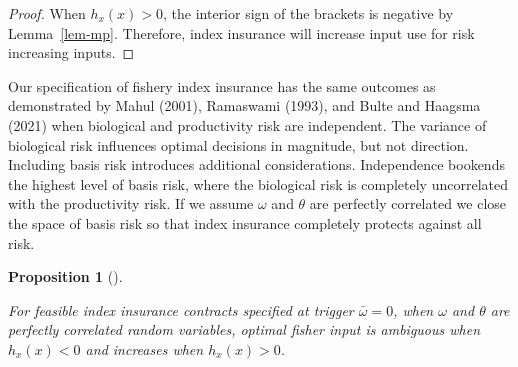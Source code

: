\documentclass[
  letterpaper,
  DIV=11,
  numbers=noendperiod]{scrartcl}
\theoremstyle{plain}
\newtheorem{proposition}{Proposition}[section]
\theoremstyle{plain}
\theoremstyle{remark}
\begin{document}
\begin{proof}
When \(h_x(x)>0\), the interior sign of the brackets is negative by
Lemma~\ref{lem-mp}. Therefore, index insurance will increase input use
for risk increasing inputs.

\end{proof}

Our specification of fishery index insurance has the same outcomes as
demonstrated by Mahul (2001), Ramaswami (1993), and Bulte and Haagsma
(2021) when biological and productivity risk are independent. The
variance of biological risk influences optimal decisions in magnitude,
but not direction. Including basis risk introduces additional
considerations. Independence bookends the highest level of basis risk,
where the biological risk is completely uncorrelated with the
productivity risk. If we assume \(\omega\) and \(\theta\) are perfectly
correlated we close the space of basis risk so that index insurance
completely protects against all risk.

\begin{proposition}[]\protect\hypertarget{prp-corr}{}\label{prp-corr}

For feasible index insurance contracts specified at trigger
\(\bar\omega=0\), when \(\omega\) and \(\theta\) are perfectly
correlated random variables, optimal fisher input is ambiguous when
\(h_x(x)<0\) and increases when \(h_x(x)>0\).

\end{proposition}
\end{document}
